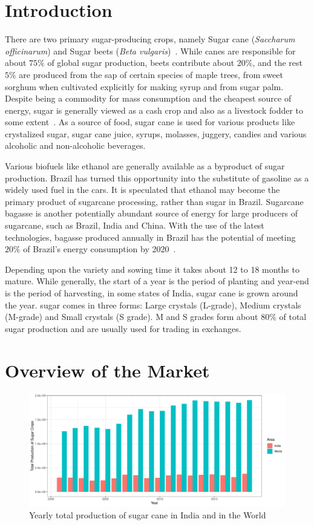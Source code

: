 \documentclass[12pt]{report}
\begin{document}
\section{Introduction}

There are two primary sugar-producing crops, namely Sugar cane (\textit{Saccharum officinarum}) and Sugar beets (\textit{Beta vulgaris})~\cite{fao-sugar-def}. While canes are responsible for about $75\%$ of global sugar production, beets contribute about $20\%$, and the rest $5\%$ are produced from the sap of certain species of maple trees, from sweet sorghum when cultivated explicitly for making syrup and from sugar palm. Despite being a commodity for mass consumption and the cheapest source of energy, sugar is generally viewed as a cash crop and also as a livestock fodder to some extent~\cite{wiki-sugar}. As a source of food, sugar cane is used for various products like crystalized sugar, sugar cane juice, syrups, molasses, juggery, candies and various alcoholic and non-alcoholic beverages.

Various biofuels like ethanol are generally available as a byproduct of sugar production. Brazil has turned this opportunity into the substitute of gasoline as a widely used fuel in the cars. It is speculated that ethanol may become the primary product of sugarcane processing, rather than sugar in Brazil. Sugarcane bagasse is another potentially abundant source of energy for large producers of sugarcane, such as Brazil, India and China. With the use of the latest technologies, bagasse produced annually in Brazil has the potential of meeting $20\%$ of Brazil's energy consumption by 2020~\cite{brazil-article}.

Depending upon the variety and sowing time it takes about 12 to 18 months to mature. While generally, the start of a year is the period of planting and year-end is the period of harvesting, in some states of India, sugar cane is grown around the year. sugar comes in three forms: Large crystals (L-grade), Medium crystals (M-grade) and Small crystals (S grade). M and S grades form about $80\%$ of total sugar production and are usually used for trading in exchanges.


\section{Overview of the Market}

\begin{figure}[h]
    \centering
    \includegraphics[width = 0.8\linewidth]{sugar-total.pdf}
    \caption{Yearly total production of sugar cane in India and in the World}
    \label{fig:sugar-total}
\end{figure}
\end{document}
